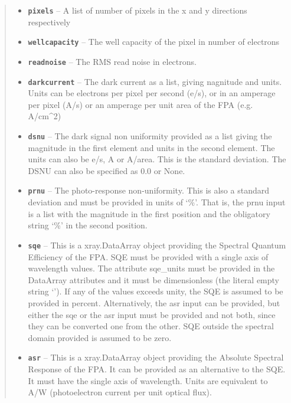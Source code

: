 \documentclass[a4paper,10pt,english]{sphinxmanual}
\begin{document}
\begin{fulllineitems}
\begin{quote}
\begin{description}
\begin{itemize}
\item {} 
\textbf{\texttt{pixels}} -- A list of number of pixels in the x and y directions respectively

\item {} 
\textbf{\texttt{wellcapacity}} -- The well capacity of the pixel in number of electrons

\item {} 
\textbf{\texttt{readnoise}} -- The RMS read noise in electrons.

\item {} 
\textbf{\texttt{darkcurrent}} -- The dark current as a list, giving nagnitude and units. Units can be electrons per pixel
per second (e/s), or in an amperage per pixel (A/s) or an amperage per unit area of the FPA (e.g. A/cm\textasciicircum{}2)

\item {} 
\textbf{\texttt{dsnu}} -- The dark signal non uniformity provided as a list giving the magnitude in the first element
and units in the second element. The units can also be e/s, A or A/area. This is the standard deviation.
The DSNU can also be specified as 0.0 or None.

\item {} 
\textbf{\texttt{prnu}} -- The photo-response non-uniformity. This is also a standard deviation and must be provided in units
of `\%'. That is, the prnu input is a list with the magnitude in the first position and the obligatory
string `\%' in the second position.

\item {} 
\textbf{\texttt{sqe}} -- This is a xray.DataArray object providing the Spectral Quantum Efficiency of the FPA. SQE must be
provided with a single axis of wavelength values. The attribute sqe\_units must be provided in the
DataArray attributes and it must be dimensionless (the literal empty string `'). If any of the values
exceeds unity, the SQE is assumed to be provided in percent. Alternatively, the asr input can be provided,
but either the sqe or the asr input must be provided and not both, since they can be converted one from
the other. SQE outside the spectral domain provided is assumed to be zero.

\item {} 
\textbf{\texttt{asr}} -- This is a xray.DataArray object providing the Absolute Spectral Response of the FPA. It can be
provided as an alternative to the SQE. It must have the single axis of wavelength. Units are equivalent
to A/W (photoelectron current per unit optical flux).


\end{itemize}
\end{description}
\end{quote}
\end{fulllineitems}
\end{document}
